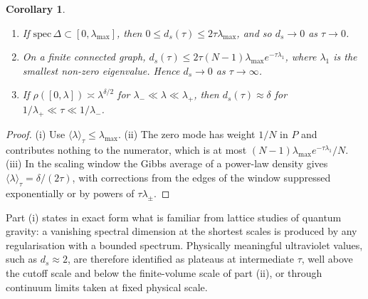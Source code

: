\documentclass[11pt]{article}
\newtheorem{corollary}{Corollary}[section]
\theoremstyle{remark}\newtheorem*{remark}{Remark}
\begin{document}
\begin{corollary}
\label{cor:limits}
\begin{enumerate}
\item[(i)] If $\mathrm{spec}\,\Delta\subset[0,\lambda_{\max}]$, then $0\le d_s(\tau)\le2\tau\lambda_{\max}$, and so $d_s\to0$ as $\tau\to0$.
\item[(ii)] On a finite connected graph, $d_s(\tau)\le2\tau(N-1)\lambda_{\max}e^{-\tau\lambda_1}$, where $\lambda_1$ is the
smallest non-zero eigenvalue. Hence $d_s\to0$ as $\tau\to\infty$.
\item[(iii)] If $\rho([0,\lambda])\asymp\lambda^{\delta/2}$ for $\lambda_-\ll\lambda\ll\lambda_+$, then $d_s(\tau)\approx\delta$ for
$1/\lambda_+\ll\tau\ll1/\lambda_-$.
\end{enumerate}
\end{corollary}
\begin{proof}
(i) Use $\langle\lambda\rangle_\tau\le\lambda_{\max}$. (ii) The zero mode has weight $1/N$ in $P$ and contributes nothing to the
numerator, which is at most $(N-1)\lambda_{\max}e^{-\tau\lambda_1}/N$. (iii) In the scaling window the Gibbs average
of a power-law density gives $\langle\lambda\rangle_\tau=\delta/(2\tau)$, with corrections from the edges of the window
suppressed exponentially or by powers of $\tau\lambda_\pm$.
\end{proof}
Part (i) states in exact form what is familiar from lattice studies of quantum gravity: a vanishing spectral
dimension at the shortest scales is produced by any regularisation with a bounded spectrum. Physically
meaningful ultraviolet values, such as $d_s\approx2$, are therefore identified as plateaus at intermediate $\tau$,
well above the cutoff scale and below the finite-volume scale of part (ii), or through continuum limits taken
at fixed physical scale.
\end{document}
